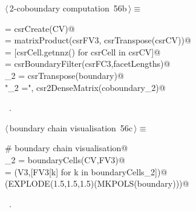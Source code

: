 \documentclass[11pt,oneside]{article}    %
\begin{document}
\begin{flushleft} \small \label{scrap96}
\protect{}$\langle\,$2-coboundary computation\nobreak\ {\footnotesize 56b}$\,\rangle\equiv$
\vspace{-1ex}
\begin{list}{}{} \item
\mbox{}\verb@csrCV = csrCreate(CV)@\\
\mbox{} = matrixProduct(csrFV3, csrTranspose(csrCV))@\\
\mbox{}\verb@facetLengths = [csrCell.getnnz() for csrCell in csrCV]@\\
\mbox{}\verb@boundary = csrBoundaryFilter(csrFC3,facetLengths)@\\
\mbox{}\verb@coboundary_2 = csrTranspose(boundary)@\\
\mbox{}\verb@print "\ncoboundary_2 =\n", csr2DenseMatrix(coboundary_2)@\\
\mbox{}\verb@@{\NWsep}
\end{list}
\vspace{-1ex}
\footnotesize\addtolength{\baselineskip}{-1ex}
\begin{list}{}{\setlength{\itemsep}{-\parsep}\setlength{\itemindent}{-\leftmargin}}
\item \NWtxtMacroRefIn\ .
\end{list}
\end{flushleft}

\begin{flushleft} \small \label{scrap97}
\protect{}$\langle\,$boundary chain visualisation\nobreak\ {\footnotesize 56c}$\,\rangle\equiv$
\vspace{-1ex}
\begin{list}{}{} \item
\mbox{}\verb@# boundary chain visualisation@\\
\mbox{}\verb@boundaryCells_2 = boundaryCells(CV,FV3)@\\
\mbox{}\verb@boundary = (V3,[FV3[k] for k in boundaryCells_2])@\\
\mbox{}\verb@VIEW(EXPLODE(1.5,1.5,1.5)(MKPOLS(boundary)))@\\
\mbox{}\verb@@{\NWsep}
\end{list}
\vspace{-1ex}
\footnotesize\addtolength{\baselineskip}{-1ex}
\begin{list}{}{\setlength{\itemsep}{-\parsep}\setlength{\itemindent}{-\leftmargin}}
\item \NWtxtMacroRefIn\ .
\end{list}
\end{flushleft}
\end{document}
